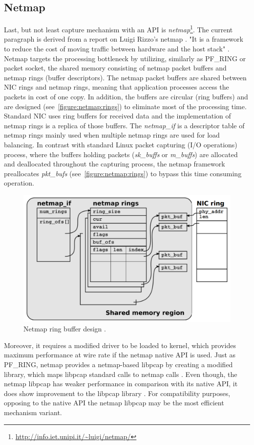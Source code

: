 \documentclass[12pt,a4paper,twoside]{report}
\begin{document}
		\subsection{Netmap} \label{analysis:mechs:netmap}
			Last, but not least capture mechanism with an API is \emph{netmap}\footnote{\url{http://info.iet.unipi.it/~luigi/netmap/}}. The current paragraph is derived from a report on Luigi Rizzo's netmap \cite{report:netmap}. "It is a framework to reduce the cost of moving traffic between hardware and the host stack" \cite{report:netmap}. Netmap targets the processing bottleneck by utilizing, similarly as PF\_RING or packet socket, the shared memory consisting of netmap packet buffers and netmap rings (buffer descriptors). The netmap packet buffers are shared between NIC rings and netmap rings, meaning that application processes access the packets in cost of one copy. In addition, the buffers are circular (ring buffers) and are designed (see~\autoref{figure:netmap:rings}) to eliminate most of the processing time. Standard NIC uses ring buffers for received data and the implementation of netmap rings is a replica of those buffers. The \emph{netmap\_if} is a descriptor table of netmap rings mainly used when multiple netmap rings are used for load balancing. In contrast with standard Linux packet capturing (I/O operations) process, where the buffers holding packets (\emph{sk\_buffs} or \emph{m\_buffs}) are allocated and deallocated throughout the capturing process, the netmap framework preallocates \emph{pkt\_bufs} (see~\autoref{figure:netmap:rings}) to bypass this time consuming operation.\par
			\begin{figure}
				\centering
				\includegraphics[scale=0.3]{netmap_rings}
				\caption{Netmap ring buffer design \cite{image:netmap}.}
				\label{figure:netmap:rings}
			\end{figure}
			Moreover, it requires a modified driver to be loaded to kernel, which provides maximum performance at wire rate if the netmap native API is used. Just as PF\_RING, netmap provides a netmap-based libpcap by creating a modified library, which maps libpcap standard calls to netmap calls \cite{report:netmap}. Even though, the netmap libpcap has weaker performance in comparison with its native API, it does show improvement to the libpcap library \cite{video:netmap}. For compatibility purposes, opposing to the native API the netmap libpcap may be the most efficient mechanism variant.
\end{document}

